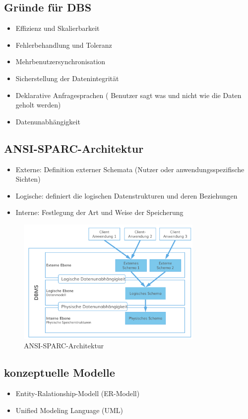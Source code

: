 \documentclass[a4paper]{article}
\begin{document}
\subsection{Gründe für DBS}
\begin{itemize}
    \item Effizienz und Skalierbarkeit
    \item Fehlerbehandlung und Toleranz
    \item Mehrbenutzersynchronisation
    \item Sicherstellung der Datenintegrität
    \item Deklarative Anfragesprachen ( Benutzer sagt was und nicht wie die Daten geholt werden)
    \item Datenunabhängigkeit
\end{itemize}

\subsection{ANSI-SPARC-Architektur}
\begin{itemize}
    \item Externe: Definition externer Schemata (Nutzer oder anwendungsspezifische Sichten)
    \item Logische: definiert die logischen Datenstrukturen und deren Beziehungen
    \item Interne: Festlegung der Art und Weise der Speicherung
\end{itemize}

\begin{figure}[htp]
    \centering
    \includegraphics[width=9cm]{images/ANSI-SPARC}
    \caption{ANSI-SPARC-Architektur}
    \label{fig:ANSI-SPARC}
\end{figure}

\subsection{konzeptuelle Modelle}
\begin{itemize}
    \item Entity-Ralationship-Modell (ER-Modell)
    \item Unified Modeling Language (UML)
\end{itemize}
\end{document}
